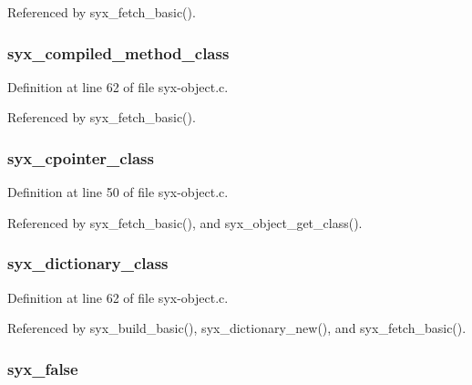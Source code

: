 Referenced by syx\_\-fetch\_\-basic().\hypertarget{syx-object_8c_3fbdf382946e90aa0f7344bf731bf4a8}{
\subsubsection{ {\bf syx\_\-compiled\_\-method\_\-class}}}
\label{syx-object_8c_3fbdf382946e90aa0f7344bf731bf4a8}




Definition at line 62 of file syx-object.c.

Referenced by syx\_\-fetch\_\-basic().\hypertarget{syx-object_8c_8cad5bfec024ce53ab7561d648810e64}{
\subsubsection{ {\bf syx\_\-cpointer\_\-class}}}
\label{syx-object_8c_8cad5bfec024ce53ab7561d648810e64}




Definition at line 50 of file syx-object.c.

Referenced by syx\_\-fetch\_\-basic(), and syx\_\-object\_\-get\_\-class().\hypertarget{syx-object_8c_dd15828b4f6578c666ac5fcea0f1e48c}{
\subsubsection{ {\bf syx\_\-dictionary\_\-class}}}
\label{syx-object_8c_dd15828b4f6578c666ac5fcea0f1e48c}




Definition at line 62 of file syx-object.c.

Referenced by syx\_\-build\_\-basic(), syx\_\-dictionary\_\-new(), and syx\_\-fetch\_\-basic().\hypertarget{syx-object_8c_f40bef822ab93070372bb305d0443bd5}{
\subsubsection{ {\bf syx\_\-false}}}
\label{syx-object_8c_f40bef822ab93070372bb305d0443bd5}




